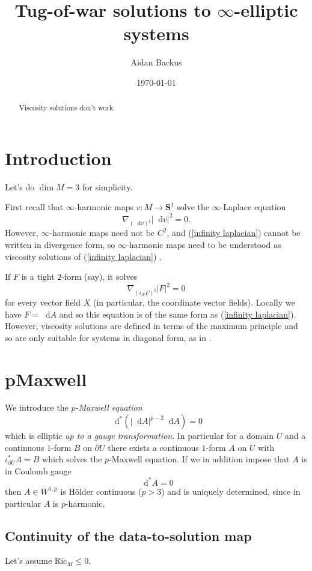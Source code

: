 \documentclass[reqno,11pt]{amsart}
\title{Tug-of-war solutions to $\infty$-elliptic systems}
\author{Aidan Backus}
\date{\today}
\newcommand{\Sph}{\mathbf S}
\newcommand*\dif{\mathop{}\!\mathrm{d}}
\newcommand{\Ric}{\mathrm{Ric}}
\newcommand{\dfn}[1]{\emph{#1}\index{#1}}
\theoremstyle{definition}
\numberwithin{equation}{section}
\begin{document}
\begin{abstract}
Viscosity solutions don't work
\end{abstract}

\maketitle

\section{Introduction}
Let's do $\dim M = 3$ for simplicity.

First recall that $\infty$-harmonic maps $v: M \to \Sph^1$ solve the $\infty$-Laplace equation 
\begin{equation}\label{infinity laplacian}
\nabla_{(\dif v)^\sharp} |\dif v|^2 = 0.
\end{equation}
However, $\infty$-harmonic maps need not be $C^2$, and (\ref{infinity laplacian}) cannot be written in divergence form, so $\infty$-harmonic maps need to be understood as viscosity solutions of (\ref{infinity laplacian}) \cite{Crandall2008}.

If $F$ is a tight $2$-form (say), it solves 
$$\nabla_{(\iota_X F)^\sharp} |F|^2 = 0$$
for every vector field $X$ (in particular, the coordinate vector fields).
Locally we have $F = \dif A$ and so this equation is of the same form as (\ref{infinity laplacian}).
However, viscosity solutions are defined in terms of the maximum principle and so are only suitable for systems in diagonal form, as in \cite{Ishii92}.

\section{pMaxwell}
We introduce the \dfn{$p$-Maxwell equation}
$$\dif^*(|\dif A|^{p - 2} \dif A) = 0$$
which is elliptic \emph{up to a gauge transformation}. 
In particular for a domain $U$ and a continuous $1$-form $B$ on $\partial U$ there exists a continuous $1$-form $A$ on $U$ with $\iota_{\partial U}^* A = B$ which solves the $p$-Maxwell equation.
If we in addition impose that $A$ is in Coulomb gauge 
$$\dif^* A = 0$$
then $A \in W^{1, p}$ is H\"older continuous ($p > 3$) and is uniquely determined, since in particular $A$ is $p$-harmonic.

\subsection{Continuity of the data-to-solution map}
Let's assume $\Ric_M \leq 0.$
\end{document}
